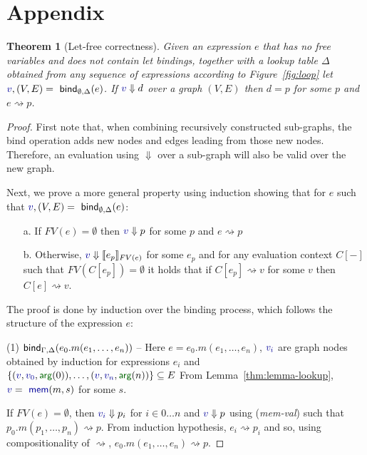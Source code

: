 \documentclass[sigplan,10pt]{acmart}\settopmatter{printfolios=true,printccs=false,printacmref=false}
\newcounter{thc}
\theoremstyle{plain}
\newtheorem{theorem}[thc]{Theorem}
\theoremstyle{definition}
\newcommand{\ident}[1]{\textnormal{\sffamily #1}}
\newcommand{\bndclr}[1]{\textcolor{kvdclr}{#1}}
\newcommand{\bnd}[1]{\textnormal{\textcolor{kvdclr}{\sffamily #1}}}
\newcommand{\blbl}[1]{\textnormal{\textcolor{numclr}{\sffamily #1}}}
\begin{document}
\section{Appendix}
\label{sec:app-correctness}
\begin{theorem}[Let-free correctness]
Given an expression $e$ that has no free variables and does not contain let bindings, together
with a lookup table $\Delta$ obtained from any sequence of expressions according to Figure~\ref{fig:loop}
let $\bndclr{v}, (V, E) = \ident{bind}_{\emptyset, \Delta}(e)$. If $\bndclr{v}\Downarrow d$ 
over a graph $(V, E)$ then $d = p$ for some $p$ and $e \rightsquigarrow p$.
\end{theorem}
\begin{proof}
First note that, when combining recursively constructed sub-graphs, the \ident{bind} operation
adds new nodes and edges leading from those new nodes. Therefore, an evaluation using $\Downarrow$
over a sub-graph will also be valid over the new graph.

Next, we prove a more general property using induction showing that for $e$ such 
that $\bndclr{v}, (V, E) = \ident{bind}_{\emptyset, \Delta}(e)$:
\begin{enumerate}
\item[a.] If $FV(e)=\emptyset$ then $\bndclr{v} \Downarrow p$ for some $p$ and $e \rightsquigarrow p$
\item[b.] Otherwise, $\bndclr{v} \Downarrow \llbracket e_p \rrbracket_{FV(e)}$ for some $e_p$ and
  for any evaluation context $C[-]$ such that $FV(C[e_p])=\emptyset$ it holds that if
  $C[e_p] \rightsquigarrow v$ for some $v$ then $C[e] \rightsquigarrow v$.  
\end{enumerate}

The proof is done by induction over the binding process, which follows the structure 
of the expression $e$:

\vspace{0.75em}\noindent(1) $\ident{bind}_{\Gamma, \Delta}(e_0.m(e_1, \ldots, e_n))$ -- 
  Here $e = e_0.m(e_1, \ldots, e_n)$, $\bndclr{v_i}$ are graph nodes obtained by induction for
  expressions $e_i$ and $\{ (\bndclr{v}, \bndclr{v_0}, \blbl{arg}(0)), \ldots, (\bndclr{v}, \bndclr{v_n}, \blbl{arg}(n))\} \subseteq E$
  From Lemma~\ref{thm:lemma-lookup}, $\bndclr{v} = \bnd{mem}(m, s)$ for some $s$.
  
  If $FV(e)=\emptyset$, then $\bndclr{v_i} \Downarrow p_i$ for $i\in 0\ldots n$ and   
  $\bndclr{v}\Downarrow p$ using (\emph{mem-val}) such that $p_0.m(p_1, \ldots, p_n) \rightsquigarrow p$. 
  From induction hypothesis, $e_i \rightsquigarrow p_i$ and so, using compositionality of $\rightsquigarrow$, 
  $e_0.m(e_1, \ldots, e_n) \rightsquigarrow p$.
  

\end{proof}
\end{document}
